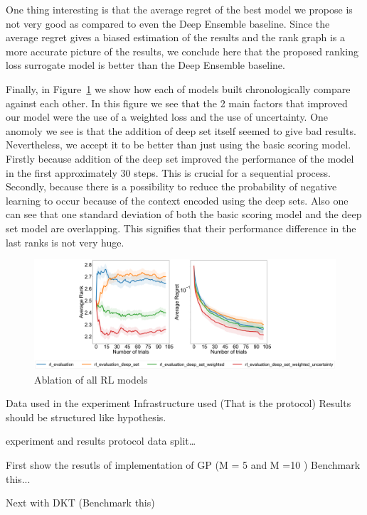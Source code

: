\documentclass[12pt, twoside, ngerman]{report}
\begin{document}
One thing interesting is that the average regret of the best model we propose is not very good as compared to even the Deep Ensemble baseline.
Since the average regret gives a biased estimation of the results and the rank graph is a more accurate picture of the results,  we conclude here that the proposed ranking loss surrogate model is better than the Deep Ensemble baseline.

Finally, in Figure~\ref{fig:FinalAblation} we show how each of models built chronologically compare against each other.
In this figure we see that the 2 main factors that improved our model were the use of a weighted loss and the use of uncertainty.
One anomoly we see is that the addition of deep set itself seemed to give bad results.
Nevertheless, we accept it to be better than just using the basic scoring model.
Firstly because addition of the deep set improved the performance of the model in the first approximately 30 steps.
This is crucial for a sequential process.
Secondly,  because there is a possibility to reduce the probability of negative learning to occur because of the context encoded using  the deep sets.
Also one can see that one standard deviation of both the basic scoring model and the deep set model are overlapping. 
This signifies that their performance difference in the last ranks is not very huge.

\begin{figure}[h]
  \centering
    \includegraphics[scale=0.20]{images/FinalAblation}
    \caption{Ablation of all RL models}
    \label{fig:FinalAblation}
\end{figure}


\iffalse
Data used in the experiment
Infrastructure used
(That is the protocol)
Results should be structured like hypothesis.

experiment and results
protocol
data split…

First show the resutls of implementation of GP (M = 5 and M =10 )
Benchmark this...

Next with DKT (Benchmark this)
\end{document}
